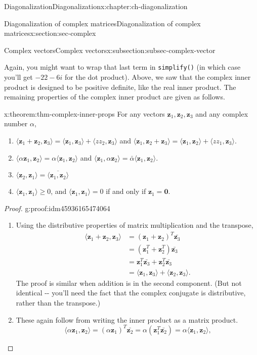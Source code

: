 \documentclass[oneside,10pt,]{book}
\newcommand{\mono}[1]{\texttt{#1}}
\numberwithin{equation}{section}
\newcommand{\zz}{\mathbf{z}}
\newcommand{\amp}{&}
\begin{document}
\begin{chapterptx}{Diagonalization}{}{Diagonalization}{}{}{x:chapter:ch-diagonalization}
\begin{sectionptx}{Diagonalization of complex matrices}{}{Diagonalization of complex matrices}{}{}{x:section:sec-complex}
\begin{subsectionptx}{Complex vectors}{}{Complex vectors}{}{}{x:subsection:subsec-complex-vector}
\begin{sageoutput}
\end{sageoutput}
Again, you might want to wrap that last term in \mono{simplify()} (in which case you'll get \(-22-6i\) for the dot product). Above, we saw that the complex inner product is designed to be positive definite, like the real inner product. The remaining properties of the complex inner product are given as follows.%
\begin{theorem}{}{}{x:theorem:thm-complex-inner-props}%
For any vectors \(\zz_1,\zz_2,\zz_3\) and any complex number \(\alpha\),%
\begin{enumerate}
\item{}\(\langle \zz_1+\zz_2,\zz_3\rangle = \langle \zz_1,\zz_3\rangle + \langle zz_2,\zz_3\rangle\) and \(\langle \zz_1,\zz_2+\zz_3\rangle = \langle \zz_1,\zz_2\rangle + \langle zz_1,\zz_3\rangle\).%
\item{}\(\langle \alpha\zz_1,\zz_2\rangle = \alpha\langle\zz_1,\zz_2\rangle\) and \(\langle \zz_1,\alpha\zz_2\rangle=\bar{\alpha}\langle \zz_1,\zz_2\rangle\).%
\item{}\(\displaystyle \langle \zz_2,\zz_1\rangle = \overline{\langle \zz_1,\zz_2\rangle}\)%
\item{}\(\langle \zz_1,\zz_1\rangle\geq 0\), and \(\langle \zz_1,\zz_1\rangle =0\) if and only if \(\zz_1=\mathbf{0}\).%
\end{enumerate}
%
\end{theorem}
\begin{proof}{}{g:proof:idm45936165474064}
%
\begin{enumerate}
\item{}Using the distributive properties of matrix multiplication and the transpose,%
\begin{align*}
\langle \zz_1+\zz_2,\zz_3\rangle \amp= (\zz_1+\zz_2)^T\bar{\zz_3}\\
\amp =(\zz_1^T+\zz_2^T)\bar{\zz_3}\\
\amp =\zz_1^T\bar{\zz_3}+\zz_2^T\bar{\zz_3}\\
\amp =\langle \zz_1,\zz_3\rangle + \langle \zz_2,\zz_3\rangle\text{.}
\end{align*}
The proof is similar when addition is in the second component. (But not identical -{}-{} you'll need the fact that the complex conjugate is distributive, rather than the transpose.)%
\item{}These again follow from writing the inner product as a matrix product.%
\begin{equation*}
\langle \alpha\zz_1,\zz_2\rangle = (\alpha \zz_1)^T\bar{\zz_2} = \alpha(\zz_1^T\bar{\zz_2}) = \alpha\langle\zz_1,\zz_2\rangle\text{,}

\end{equation*}
\end{enumerate}
\end{proof}
\end{subsectionptx}
\end{sectionptx}
\end{chapterptx}
\end{document}
